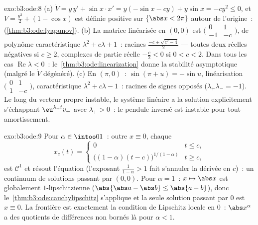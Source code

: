 \begin{solution}{exo:b3:ode:8}
(a) $\dot V = y\,y' + \sin x\cdot x' = y(-\sin x - cy) +
y\sin x = -cy^2 \leq 0$, et $V = \frac{y^2}2 + (1 - \cos x)$
est définie positive sur $\{\abs x < 2\pi\}$ autour de
l'origine~:  (\cref{thm:b3:ode:lyapunov}).
(b) La matrice linéarisée en $(0,0)$ est
$\bigl(\begin{smallmatrix}0 & 1\\ -1 &
-c\end{smallmatrix}\bigr)$, de polynôme caractéristique
$\lambda^2 + c\lambda + 1$~: racines $\frac{-c \pm \sqrt{c^2
- 4}}2$ --- toutes deux réelles négatives si $c \geq 2$,
complexes de partie réelle $-\frac c2 < 0$ si $0 < c < 2$.
Dans tous les cas $\operatorname{Re}\lambda < 0$~:
le~\cref{thm:b3:ode:linearization} donne la stabilité
asymptotique (malgré le $\dot V$ dégénéré).
(c) En $(\pi, 0)$~: $\sin(\pi + u) = -\sin u$, linéarisation
$\bigl(\begin{smallmatrix}0&1\\1&-c\end{smallmatrix}\bigr)$,
caractéristique $\lambda^2 + c\lambda - 1$~: racines de signes
opposés ($\lambda_+\lambda_- = -1$). Le long du vecteur
propre instable, le système linéaire a la solution
explicitement s'échappant $\eu^{\lambda_+t}v_+$ avec
$\lambda_+ > 0$~: le pendule inversé est instable pour tout
amortissement.
\end{solution}

\begin{solution}{exo:b3:ode:9}
Pour $\alpha \in \intoo01$~: outre $x \equiv 0$, chaque
\[
x_c(t) = \begin{cases}0 & t \leq c,\\
\bigl((1-\alpha)(t - c)\bigr)^{1/(1-\alpha)} & t \geq c,
\end{cases}
\]
est $\mathcal C^1$ et résout l'équation (l'exposant
$\frac1{1-\alpha} > 1$ fait s'annuler la dérivée en $c$)~: un
continuum de solutions passant par $(0,0)$. Pour $\alpha =
1$~: $x \mapsto \abs x$ est globalement $1$-lipschitzienne
($\abs{\abs a - \abs b} \leq \abs{a - b}$), donc
le~\cref{thm:b3:ode:cauchylipschitz} s'applique et la seule
solution passant par $0$ est $x \equiv 0$. La frontière est
exactement la condition de Lipschitz locale en $0$~:
$\abs x^\alpha$ a des quotients de différences non bornés là
pour $\alpha < 1$.
\end{solution}

